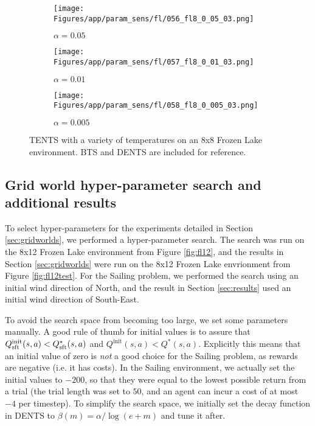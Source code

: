 \documentclass{article}
\newcommand{\Qss}[2]{Q^*_{\textnormal{sft}}(#1,#2)}
\theoremstyle{plain}
\begin{document}
\begin{appendices}
\begin{figure}
                \begin{subfigure}[b]{0.32\textwidth}
                    \centering
                    \texttt{[image: Figures/app/param\_sens/fl/056\_fl8\_0\_05\_03.png]}
                    \caption{$\alpha=0.05$}
                \end{subfigure}
                \begin{subfigure}[b]{0.32\textwidth}
                    \centering
                    \texttt{[image: Figures/app/param\_sens/fl/057\_fl8\_0\_01\_03.png]}
                    \caption{$\alpha=0.01$}
                \end{subfigure}
                \begin{subfigure}[b]{0.32\textwidth}
                    \centering
                    \texttt{[image: Figures/app/param\_sens/fl/058\_fl8\_0\_005\_03.png]}
                    \caption{$\alpha=0.005$}
                \end{subfigure}
                
                \caption{TENTS with a variety of temperatures on an 8x8 Frozen Lake environment. BTS and DENTS are included for reference.}
                \label{fig:fl_param_sens_tents}
            \end{figure}


            \FloatBarrier

        




    \subsection{Grid world hyper-parameter search and additional results} \label{app:hps}
        To select hyper-parameters for the experiments detailed in Section \ref{sec:gridworlds}, we performed a hyper-parameter search. The search was run on the 8x12 Frozen Lake environment from Figure \ref{fig:fl12}, and the results in Section \ref{sec:gridworlds} were run on the 8x12 Frozen Lake envrionment from Figure \ref{fig:fl12test}. For the Sailing problem, we performed the search using an initial wind direction of North, and the result in Section \ref{sec:results} used an initial wind direction of South-East.

        To avoid the search space from becoming too large, we set some parameters manually. A good rule of thumb for initial values is to assure that $Q^{\text{init}}_{\text{sft}}(s,a) < \Qss{s}{a}$ and $Q^{\text{init}}(s,a) < Q^*(s,a)$. Explicitly this means that an initial value of zero is \textit{not} a good choice for the Sailing problem, as rewards are negative (i.e. it has costs). In the Sailing environment, we actually set the initial values to $-200$, so that they were equal to the lowest possible return from a trial (the trial length was set to $50$, and an agent can incur a cost of at most $-4$ per timestep). To simplify the search space, we initially set the decay function in DENTS to $\beta(m)=\alpha/\log(e+m)$ and tune it after. 


\end{appendices}
\end{document}
